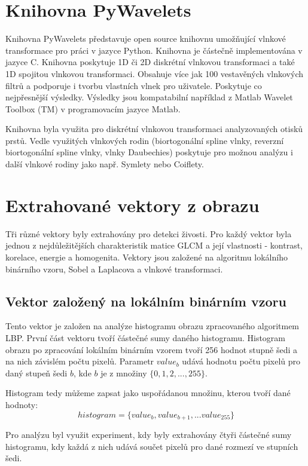 \section{Knihovna PyWavelets}
Knihovna PyWavelets představuje open source knihovnu umožňující vlnkové transformace pro práci v jazyce Python. Knihovna je částečně implementována v jazyce C. Knihovna poskytuje 1D či 2D diskrétní vlnkovou transformaci a také 1D spojitou vlnkovou transformaci. Obsahuje více jak 100 vestavěných vlnkových filtrů a podporuje i tvorbu vlastních vlnek pro uživatele. Poskytuje co nejpřesnější výsledky. Výsledky jsou kompatabilní například z Matlab Wavelet Toolbox (TM) v programovacím jazyce Matlab.

Knihovna byla využita pro diskrétní vlnkovou transformaci analyzovaných otisků prstů. Vedle využitých vlnkových rodin (biortogonální spline vlnky, reverzní biortogonální spline vlnky, vlnky Daubechies) poskytuje pro možnou analýzu i další vlnkové rodiny jako např. Symlety nebo Coiflety. \cite{PywtAbout}

\section{Extrahované vektory z obrazu}
Tři různé vektory byly extrahovány pro detekci živosti. Pro každý vektor byla jednou z nejdůležitějších charakteristik matice GLCM a její vlastnosti - kontrast, korelace, energie a homogenita. Vektory jsou založené na algoritmu lokálního binárního vzoru, Sobel a Laplacova a vlnkové transformaci.

\subsection{Vektor založený na lokálním binárním vzoru}
Tento vektor je založen na analýze histogramu obrazu zpracovaného algoritmem LBP. První část vektoru tvoří částečné sumy daného histogramu. Histogram obrazu po zpracování lokálním binárním vzorem tvoří 256 hodnot stupně šedi a na nich závislém počtu pixelů. Parametr $value_b$ udává hodnotu počtu pixelů pro daný stupeň šedi $b$, kde $b$ je z množiny $\{0,1,2,...,255\}$.

Histogram tedy můžeme zapsat jako uspořádanou množinu, kterou tvoří dané hodnoty:
$$histogram = \{value_b, value_{b+1}, ... value_{255}\}$$

Pro analýzu byl využit experiment, kdy byly extrahovány čtyři částečné sumy histogramu, kdy každá z nich udává součet pixelů pro dané rozmezí ve stupních šedi.

